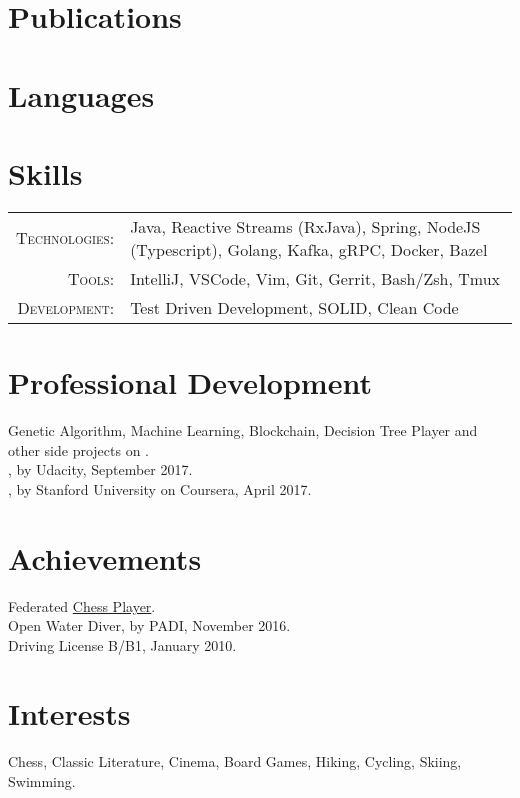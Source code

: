 \section{Publications}

\newpage

\section{Languages}

\section{Skills}
\begin{tabular}{r p{12.5cm}}
\textsc{Technologies:} & Java, Reactive Streams (RxJava), Spring, NodeJS (Typescript), Golang, Kafka, gRPC, Docker, Bazel\\
\textsc{Tools:} & IntelliJ, VSCode, Vim, Git, Gerrit, Bash/Zsh, Tmux\\
\textsc{Development:} & Test Driven Development, SOLID, Clean Code
\end{tabular}

\section{Professional Development}
\noindent
\bulletText Genetic Algorithm, Machine Learning, Blockchain, Decision Tree Player and other side projects on \gitHubNoUrl{}.\\
\bulletText \certificateFE{}, by Udacity, September 2017.\\
\bulletText \certificateML{}, by Stanford University on Coursera, April 2017. %

\section{Achievements}
\noindent
\bulletText Federated \href{http://ratings.fide.com/card.phtml?event=1958720}{Chess Player}.\\
\bulletText Open Water Diver, by PADI, November 2016.\\
\bulletText Driving License B/B1, January 2010.

\section{Interests}
\noindent
\horizontalSpace Chess, Classic Literature, Cinema, Board Games, Hiking, Cycling, Skiing, Swimming.
